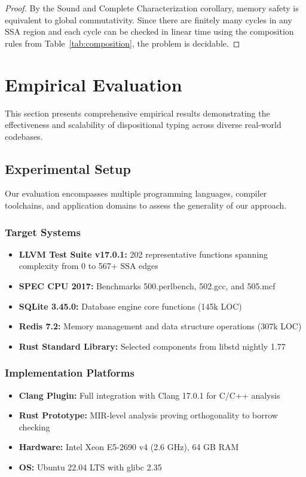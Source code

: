 \documentclass[acmsmall,anonymous,review,screen]{acmart}
\begin{document}
	\begin{proof}
		By the Sound and Complete Characterization corollary, memory safety is equivalent to global commutativity. Since there are finitely many cycles in any SSA region and each cycle can be checked in linear time using the composition rules from Table~\ref{tab:composition}, the problem is decidable.
	\end{proof}
	
	\section{Empirical Evaluation}
	\label{sec:evaluation}
	
	This section presents comprehensive empirical results demonstrating the effectiveness and scalability of dispositional typing across diverse real-world codebases.
	
	\subsection{Experimental Setup}
	
	Our evaluation encompasses multiple programming languages, compiler toolchains, and application domains to assess the generality of our approach.
	
	\subsubsection{Target Systems}
	\begin{itemize}
		\item \textbf{LLVM Test Suite v17.0.1:} 202 representative functions spanning complexity from 0 to 567+ SSA edges
		\item \textbf{SPEC CPU 2017:} Benchmarks 500.perlbench, 502.gcc, and 505.mcf
		\item \textbf{SQLite 3.45.0:} Database engine core functions (145k LOC)
		\item \textbf{Redis 7.2:} Memory management and data structure operations (307k LOC)
		\item \textbf{Rust Standard Library:} Selected components from libstd nightly 1.77
	\end{itemize}
	
	\subsubsection{Implementation Platforms}
	\begin{itemize}
		\item \textbf{Clang Plugin:} Full integration with Clang 17.0.1 for C/C++ analysis
		\item \textbf{Rust Prototype:} MIR-level analysis proving orthogonality to borrow checking
		\item \textbf{Hardware:} Intel Xeon E5-2690 v4 (2.6 GHz), 64 GB RAM
		\item \textbf{OS:} Ubuntu 22.04 LTS with glibc 2.35
	\end{itemize}
	
\end{document}
